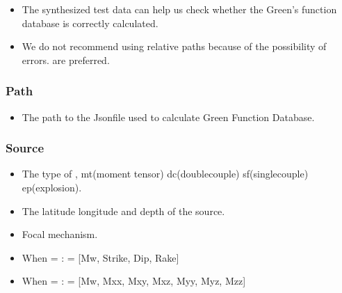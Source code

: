 \documentclass[a4paper,10pt,english,openany]{sphinxmanual}
\begin{document}
\begin{itemize}
\item {} 
The synthesized test data can help us check whether the Green’s function database is correctly calculated.

\item {} 
We do not recommend using relative paths because of the possibility of errors.  are preferred.

\end{itemize}


\subsubsection{Path}
\label{\detokenize{tutorials/S2_Syn_Waveform:path}}
\begin{itemize}
\item {} 
The path to the Json\sphinxhyphen{}file used to calculate Green Function Database.

\end{itemize}


\subsubsection{Source}
\label{\detokenize{tutorials/S2_Syn_Waveform:source}}
\begin{itemize}
\item {} 
The type of , mt(moment tensor) dc(double\sphinxhyphen{}couple) sf(single\sphinxhyphen{}couple) ep(explosion).

\end{itemize}

\begin{itemize}
\item {} 
The latitude longitude and depth of the source.

\end{itemize}

\begin{itemize}
\item {} 
Focal mechanism.

\item {} 
When  = :  = {[}Mw, Strike, Dip, Rake{]}

\item {} 
When  = :  = {[}Mw, Mxx, Mxy, Mxz, Myy, Myz, Mzz{]}

\end{itemize}
\end{document}
